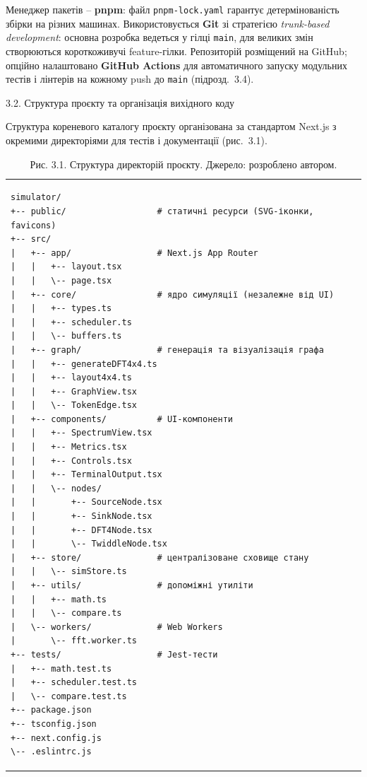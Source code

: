 \documentclass[
]{article}
\begin{document}
Менеджер пакетів -- \textbf{pnpm}: файл \texttt{pnpm-lock.yaml} гарантує
детермінованість збірки на різних машинах. Використовується \textbf{Git}
зі стратегією \emph{trunk-based development}: основна розробка ведеться
у гілці \texttt{main}, для великих змін створюються короткоживучі
feature-гілки. Репозиторій розміщений на GitHub; опційно налаштовано
\textbf{GitHub Actions} для автоматичного запуску модульних тестів і
лінтерів на кожному push до \texttt{main} (підрозд.~3.4).

\protect{}\label{_Toc229681128}{}3.2. Структура проєкту та
організація вихідного коду

Структура кореневого каталогу проєкту організована за стандартом Next.js
з окремими директоріями для тестів і документації (рис.~3.1).

\begin{longtable}[]{@{}
  >{\raggedright\arraybackslash}p{}@{}}
\caption{Рис. 3.1. Структура директорій проєкту. Джерело: розроблено
автором.}\tabularnewline
\toprule\noalign{}
\endfirsthead
\endhead
\bottomrule\noalign{}
\endlastfoot
\begin{minipage}[t]{\linewidth}\raggedright
\begin{verbatim}
simulator/
+-- public/                  # статичні ресурси (SVG-іконки, favicons)
+-- src/
|   +-- app/                 # Next.js App Router
|   |   +-- layout.tsx
|   |   \-- page.tsx
|   +-- core/                # ядро симуляції (незалежне від UI)
|   |   +-- types.ts
|   |   +-- scheduler.ts
|   |   \-- buffers.ts
|   +-- graph/               # генерація та візуалізація графа
|   |   +-- generateDFT4x4.ts
|   |   +-- layout4x4.ts
|   |   +-- GraphView.tsx
|   |   \-- TokenEdge.tsx
|   +-- components/          # UI-компоненти
|   |   +-- SpectrumView.tsx
|   |   +-- Metrics.tsx
|   |   +-- Controls.tsx
|   |   +-- TerminalOutput.tsx
|   |   \-- nodes/
|   |       +-- SourceNode.tsx
|   |       +-- SinkNode.tsx
|   |       +-- DFT4Node.tsx
|   |       \-- TwiddleNode.tsx
|   +-- store/               # централізоване сховище стану
|   |   \-- simStore.ts
|   +-- utils/               # допоміжні утиліти
|   |   +-- math.ts
|   |   \-- compare.ts
|   \-- workers/             # Web Workers
|       \-- fft.worker.ts
+-- tests/                   # Jest-тести
|   +-- math.test.ts
|   +-- scheduler.test.ts
|   \-- compare.test.ts
+-- package.json
+-- tsconfig.json
+-- next.config.js
\-- .eslintrc.js
\end{verbatim}
\end{minipage} \\
\end{longtable}
\end{document}
